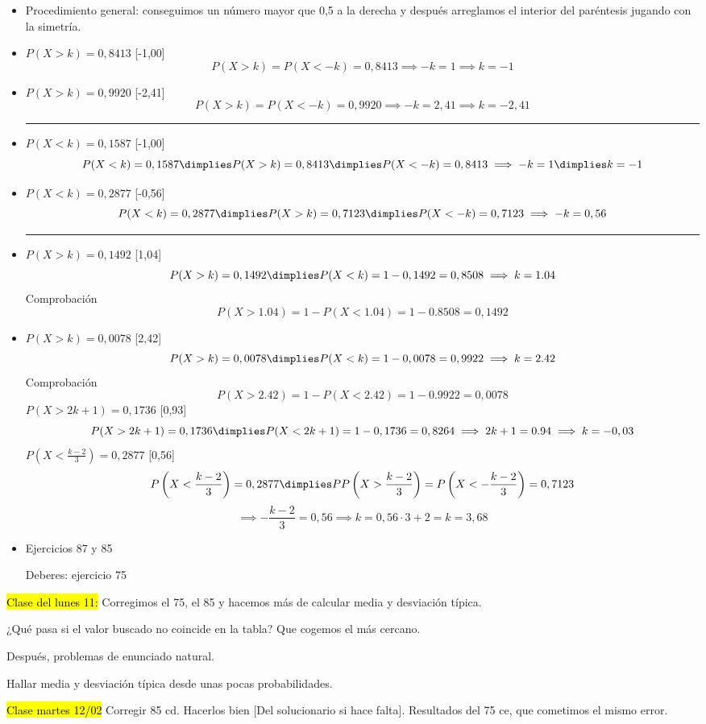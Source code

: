 \begin{itemize}
	\item Procedimiento general: conseguimos un número mayor que 0,5 a la derecha y después arreglamos el interior del paréntesis jugando con la simetría.
	\item $P(X>k) = 0,8413$ [-1,00]
	\[P(X>k) = P(X<-k) = 0,8413 \implies -k = 1 \implies k=-1\]
	\item $P(X>k) = 0,9920$ [-2,41]
	\[P(X>k) = P(X<-k) = 0,9920 \implies -k = 2,41 \implies k=-2,41\]
	\hrule{}
	\item $P(X<k) = 0,1587$ [-1,00]
	\[P(X<k) = 0,1587 \dimplies P(X>k) = 0,8413 \dimplies P(X<-k) = 0,8413 \implies -k = 1 \dimplies k=-1\]
	\item $P(X<k) = 0,2877$ [-0,56]
	\[P(X<k) = 0,2877 \dimplies P(X>k) = 0,7123 \dimplies P(X<-k) = 0,7123 \implies -k = 0,56\]
	\hrule{}
	\item $P(X>k) = 0,1492$ [1,04]
	\[ P(X>k) = 0,1492 \dimplies P(X<k) = 1-0,1492 = 0,8508 \implies k=1.04\]
	Comprobación \[P(X>1.04) = 1-P(X<1.04) = 1- 0.8508 = 0,1492\]
	\item $P(X>k) = 0,0078$ [2,42]
	\[ P(X>k) = 0,0078 \dimplies P(X<k) = 1-0,0078 = 0,9922 \implies k=2.42\]
	Comprobación \[P(X>2.42) = 1-P(X<2.42) = 1- 0.9922 = 0,0078\]
	\subitem $P(X>2k+1) = 0,1736$ [0,93]
	\[ P(X>2k+1) = 0,1736 \dimplies P(X<2k+1) = 1-0,1736 = 0,8264 \implies 2k+1=0.94 \implies k=-0,03\]
	\subitem $P\left(X<\frac{k-2}{3}\right) = 0,2877$ [0,56]
	\[ P\left(X<\frac{k-2}{3}\right) = 0,2877 \dimplies PP\left(X>\frac{k-2}{3}\right) = P\left(X<-\frac{k-2}{3}\right) = 0,7123\]
	\[ \implies -\frac{k-2}{3} = 0,56 \implies k=0,56·3+2 = k=3,68\]

	\item Ejercicios 87 y 85

	Deberes: ejercicio 75

\end{itemize}

\hl{Clase del lunes 11: } Corregimos el 75, el 85 y hacemos más de calcular media y desviación típica.

¿Qué pasa si el valor buscado no coincide en la tabla? Que cogemos el más cercano.

Después, problemas de enunciado natural.

Hallar media y desviación típica desde unas pocas probabilidades.

\hl{Clase martes 12/02}
Corregir 85 cd. Hacerlos bien [Del solucionario si hace falta].
Resultados del 75 ce, que cometimos el mismo error.


